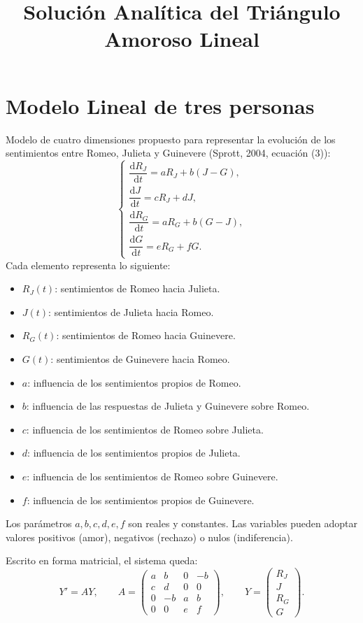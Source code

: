 \documentclass[10pt,letterpaper]{article}
\title{\textbf{Solución Analítica del Triángulo Amoroso Lineal}}
\author{}
\date{}
\newcommand{\RJ}{R_{J}}
\newcommand{\RG}{R_{G}}
\newcommand{\dd}{\mathrm{d}}
\newcommand{\mat}[1]{\begin{pmatrix}#1\end{pmatrix}}
\begin{document}
\maketitle
\vspace{-2.6em}

\section{Modelo Lineal de tres personas}
Modelo de cuatro dimensiones propuesto para representar la evolución de los sentimientos entre Romeo, Julieta y Guinevere (Sprott, 2004, ecuación (3)):
\begin{equation}\label{eq:modelo}
\boxed{\begin{cases}
\dfrac{\dd \RJ}{\dd t}=a\RJ+b(J-G),\\[3pt]
\dfrac{\dd J}{\dd t}=c\RJ+dJ,\\[3pt]
\dfrac{\dd \RG}{\dd t}=a\RG+b(G-J),\\[3pt]
\dfrac{\dd G}{\dd t}=e\RG+fG.
\end{cases}}
\end{equation}
Cada elemento representa lo siguiente:
\begin{itemize}
\item $\RJ(t)$: sentimientos de Romeo hacia Julieta.
\item $J(t)$: sentimientos de Julieta hacia Romeo.
\item $\RG(t)$: sentimientos de Romeo hacia Guinevere.
\item $G(t)$: sentimientos de Guinevere hacia Romeo.
\item $a$: influencia de los sentimientos propios de Romeo.
\item $b$: influencia de las respuestas de Julieta y Guinevere sobre Romeo.
\item $c$: influencia de los sentimientos de Romeo sobre Julieta.
\item $d$: influencia de los sentimientos propios de Julieta.
\item $e$: influencia de los sentimientos de Romeo sobre Guinevere.
\item $f$: influencia de los sentimientos propios de Guinevere.
\end{itemize}
Los parámetros $a,b,c,d,e,f$ son reales y constantes. Las variables pueden adoptar valores positivos (amor), negativos (rechazo) o nulos (indiferencia).

Escrito en forma matricial, el sistema queda:
\begin{equation}\label{eq:matriz_original}
Y'=AY,\qquad
A=\mat{a&b&0&-b\\c&d&0&0\\0&-b&a&b\\0&0&e&f},\qquad
Y=\mat{\RJ\\J\\\RG\\G}.
\end{equation}
\end{document}
